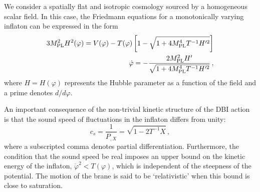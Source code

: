 We consider a spatially flat and isotropic cosmology 
sourced by a homogeneous scalar field. 
In this case, the Friedmann equations for a monotonically 
varying inflaton can be expressed in the form \cite{brane6} 
% 
\begin{eqnarray}
\label{eq:Friedmann-dbiintro}
3 M_{\mathrm{PL}}^2 H^2(\varphi ) = V(\varphi ) -T(\varphi ) 
\left[ 1- \sqrt{1+4M_{\mathrm{PL}}^4T^{-1} H'^2} \right] \\
\label{useful}
\dot{\varphi} = - \frac{2M_{\mathrm{PL}}^2H'}{\sqrt{1+4M_{\mathrm{PL}}^4 T^{-1} H'^2}} \, ,
\end{eqnarray}
% 
where $H=H(\varphi )$ represents the Hubble parameter
as a function of the field and a prime denotes $d/d\varphi$. 


An important consequence of the non-trivial kinetic structure 
of the DBI action is that the sound speed of fluctuations in the inflaton 
differs from unity:   
% 
\begin{equation}
\label{eq:csdefn-dbiintro}
c_s = \frac{1}{P_{,X}} = \sqrt{1 -2T^{-1}X}  \,,
\end{equation}
% 
where a subscripted comma denotes partial differentiation. 
Furthermore, the condition that the sound speed be real 
imposes an upper bound on the kinetic energy 
of the inflaton, $\dot{\varphi}^2 < T(\varphi)$, which 
is independent of the steepness of the potential.
The motion of the brane is said to be `relativistic' when this bound is 
close to saturation.
 

